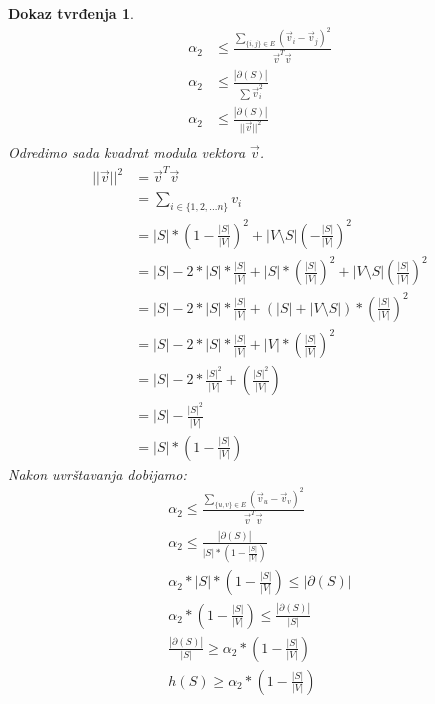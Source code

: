 \documentclass[11pt]{article}
\newtheorem*{custom_proof}{Dokaz tvrđenja}
\begin{document}
\begin{custom_proof}
		\[
        \begin{split}
            \alpha_2  & \leq \frac{ \sum_{\{i,j\} \in E} (\vec{v}_i - \vec{v}_j)^2}{\vec{v}^T \vec{v}} \\
            \alpha_2  & \leq \frac{ |\partial(S)|}{\sum \vec{v}_i^2} \\ 
            \alpha_2  & \leq \frac{ |\partial(S)|}{||\vec{v}||^2} \\ 
        \end{split}
        \]
        Odredimo sada kvadrat modula vektora $\vec{v}$.
        \[
            \begin{split}
				||\vec{v}||^2 & = \vec{v}^T\vec{v} \\
                & = \sum_{i \in \{1,2, \dots n\}} v_i \\ 
                & = |S| * (1 - \frac{|S|}{|V|})^2 + |V \setminus S| (-\frac{|S|}{|V|})^2 \\ 
                & = |S| - 2 * |S| * \frac{|S|}{|V|} + |S| * (\frac{|S|}{|V|})^2 + |V \setminus S| (\frac{|S|}{|V|})^2 \\ 
                & = |S| - 2 * |S| * \frac{|S|}{|V|} + (|S| + |V \setminus S|) * (\frac{|S|}{|V|})^2 \\ 
                & = |S| - 2 * |S| * \frac{|S|}{|V|} + |V| * (\frac{|S|}{|V|})^2 \\ 
                & = |S| - 2 * \frac{|S|^2}{|V|} + (\frac{|S|^2}{|V|}) \\ 
                & = |S| - \frac{|S|^2}{|V|} \\ 
                & = |S| * ( 1 - \frac{|S|}{|V|})  
            \end{split}
            \]
            Nakon uvrštavanja dobijamo:
            \[
            \begin{split}
                \alpha_2   \leq \frac{ \sum_{\{u,v\} \in E} (\vec{v}_u - \vec{v}_v)^2}{\vec{v}^T \vec{v}} \\
                \alpha_2   \leq \frac{ |\partial(S)|}{|S| * ( 1 - \frac{|S|}{|V|})} \\ 
                \alpha_2 * |S| * ( 1 - \frac{|S|}{|V|})  \leq |\partial(S)| \\
                \alpha_2 * ( 1 - \frac{|S|}{|V|})  \leq \frac{|\partial(S)|}{|S|} \\ 
                \frac{|\partial(S)|}{|S|}  \geq  \alpha_2 * ( 1 - \frac{|S|}{|V|}) \\ 
                h(S)  \geq  \alpha_2 * ( 1 - \frac{|S|}{|V|}) 
			\end{split}
            \]
			
		\end{custom_proof}
\end{document}
